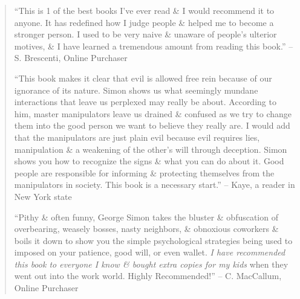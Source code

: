 \documentclass{article}
\numberwithin{equation}{section}
\begin{document}
\begin{quotation}
	``This is 1 of the best books I've ever read \& I would recommend it to anyone. It has redefined how I judge people \& helped me to become a stronger person. I used to be very naive \& unaware of people's ulterior motives, \& I have learned a tremendous amount from reading this book.'' -- S. Brescenti, Online Purchaser
	
	``This book makes it clear that evil is allowed free rein because of our ignorance of its nature. Simon shows us what seemingly mundane interactions that leave us perplexed may really be about. According to him, master manipulators leave us drained \& confused as we try to change them into the good person we want to believe they really are. I would add that the manipulators are just plain evil because evil requires lies, manipulation \& a weakening of the other's will through deception. Simon shows you how to recognize the signs \& what you can do about it. Good people are responsible for informing \& protecting themselves from the manipulators in society. This book is a necessary start.'' -- Kaye, a reader in New York state
	
	``Pithy \& often funny, George Simon takes the bluster \& obfuscation of overbearing, weasely bosses, nasty neighbors, \& obnoxious coworkers \& boils it down to show you the simple psychological strategies being used to imposed on your patience, good will, or even wallet. \textit{I have recommended this book to everyone I know \& bought extra copies for my kids} when they went out into the work world. Highly Recommended!'' -- C. MacCallum, Online Purchaser
\end{quotation}
\end{document}
